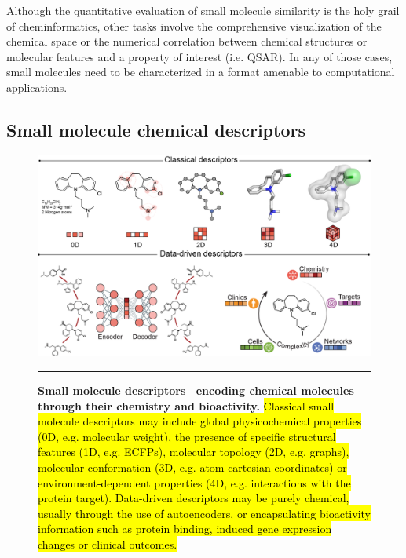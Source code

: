Although the quantitative evaluation of small molecule similarity is the holy grail of cheminformatics, other tasks involve the comprehensive visualization of the chemical space or the numerical correlation between chemical structures or molecular features and a property of interest (i.e. QSAR\cite{lenselink_beyond_2017}). In any of those cases, small molecules need to be characterized in a format amenable to computational applications. 


\subsection{Small molecule chemical descriptors }
\label{Introduction_chemicaldescriptors}

\begin{figure}[t!]
  \centering
  \includegraphics[width=\linewidth]{figures/Introduction/figure1_COCB.png}
  \caption{
    \textbf{Small molecule descriptors --encoding chemical molecules through their chemistry and bioactivity.} 
     \hl{Classical small molecule descriptors may include global physicochemical properties (0D, e.g. molecular weight), the presence of specific structural features (1D, e.g. ECFPs), molecular topology (2D, e.g. graphs), molecular conformation (3D, e.g. atom cartesian coordinates) or environment-dependent properties (4D, e.g. interactions with the protein target). Data-driven descriptors may be purely chemical, usually through the use of autoencoders, or encapsulating bioactivity information such as protein binding, induced gene expression changes or clinical outcomes.} 
  }
  \rule[0ex]{\textwidth}{0.5pt}
  \vspace{-5mm}
  \label{Introduction_Fig2}
\end{figure}


